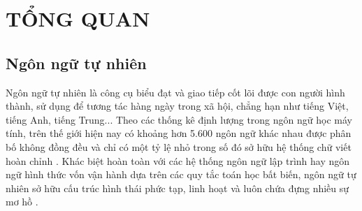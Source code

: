 
\chapter{TỔNG QUAN} %

\label{Chapter1} %


\newcommand{\keyword}[1]{\textbf{#1}}
\newcommand{\tabhead}[1]{\textbf{#1}}
\newcommand{\code}[1]{\texttt{#1}}
\newcommand{\file}[1]{\texttt{\bfseries#1}}
\newcommand{\option}[1]{\texttt{\itshape#1}}


\section{Ngôn ngữ tự nhiên}

Ngôn ngữ tự nhiên là công cụ biểu đạt và giao tiếp cốt lõi được con người hình thành, sử dụng để tương tác hàng ngày trong xã hội, chẳng hạn như tiếng Việt, tiếng Anh, tiếng Trung... Theo các thống kê định lượng trong ngôn ngữ học máy tính, trên thế giới hiện nay có khoảng hơn 5.600 ngôn ngữ khác nhau được phân bố không đồng đều và chỉ có một tỷ lệ nhỏ trong số đó sở hữu hệ thống chữ viết hoàn chỉnh \cite{jurafsky2020speech}. Khác biệt hoàn toàn với các hệ thống ngôn ngữ lập trình hay ngôn ngữ hình thức vốn vận hành dựa trên các quy tắc toán học bất biến, ngôn ngữ tự nhiên sở hữu cấu trúc hình thái phức tạp, linh hoạt và luôn chứa đựng nhiều sự mơ hồ \cite{singh2018natural}.

